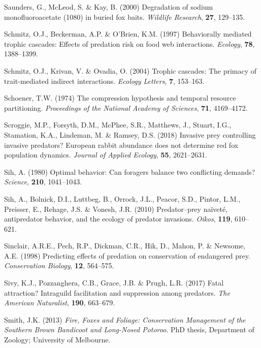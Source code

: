 \documentclass[11pt,a4paper,titlepage,twoside,openright]{style/unimelbthesis}
\begin{document}
\begin{mainmatter}
\leavevmode\hypertarget{ref-saunders2000degradation}{}%
Saunders, G., McLeod, S. \& Kay, B. (2000) Degradation of sodium monofluoroacetate (1080) in buried fox baits. \emph{Wildlife Research}, \textbf{27}, 129--135.

\leavevmode\hypertarget{ref-schmitz1997behaviorally}{}%
Schmitz, O.J., Beckerman, A.P. \& O'Brien, K.M. (1997) Behaviorally mediated trophic cascades: Effects of predation risk on food web interactions. \emph{Ecology}, \textbf{78}, 1388--1399.

\leavevmode\hypertarget{ref-schmitz2004trophic}{}%
Schmitz, O.J., Krivan, V. \& Ovadia, O. (2004) Trophic cascades: The primacy of trait-mediated indirect interactions. \emph{Ecology Letters}, \textbf{7}, 153--163.

\leavevmode\hypertarget{ref-schoener1974compression}{}%
Schoener, T.W. (1974) The compression hypothesis and temporal resource partitioning. \emph{Proceedings of the National Academy of Sciences}, \textbf{71}, 4169--4172.

\leavevmode\hypertarget{ref-scroggie2018invasive}{}%
Scroggie, M.P., Forsyth, D.M., McPhee, S.R., Matthews, J., Stuart, I.G., Stamation, K.A., Lindeman, M. \& Ramsey, D.S. (2018) Invasive prey controlling invasive predators? European rabbit abundance does not determine red fox population dynamics. \emph{Journal of Applied Ecology}, \textbf{55}, 2621--2631.

\leavevmode\hypertarget{ref-sih1980optimal}{}%
Sih, A. (1980) Optimal behavior: Can foragers balance two conflicting demands? \emph{Science}, \textbf{210}, 1041--1043.

\leavevmode\hypertarget{ref-sih2010predator}{}%
Sih, A., Bolnick, D.I., Luttbeg, B., Orrock, J.L., Peacor, S.D., Pintor, L.M., Preisser, E., Rehage, J.S. \& Vonesh, J.R. (2010) Predator--prey naïveté, antipredator behavior, and the ecology of predator invasions. \emph{Oikos}, \textbf{119}, 610--621.

\leavevmode\hypertarget{ref-sinclair1998predicting}{}%
Sinclair, A.R.E., Pech, R.P., Dickman, C.R., Hik, D., Mahon, P. \& Newsome, A.E. (1998) Predicting effects of predation on conservation of endangered prey. \emph{Conservation Biology}, \textbf{12}, 564--575.

\leavevmode\hypertarget{ref-sivy2017fatal}{}%
Sivy, K.J., Pozzanghera, C.B., Grace, J.B. \& Prugh, L.R. (2017) Fatal attraction? Intraguild facilitation and suppression among predators. \emph{The American Naturalist}, \textbf{190}, 663--679.

\leavevmode\hypertarget{ref-smith2013fire}{}%
Smith, J.K. (2013) \emph{Fire, Foxes and Foliage: Conservation Management of the Southern Brown Bandicoot and Long-Nosed Potoroo}. PhD thesis, Department of Zoology; University of Melbourne.


\end{mainmatter}
\end{document}
